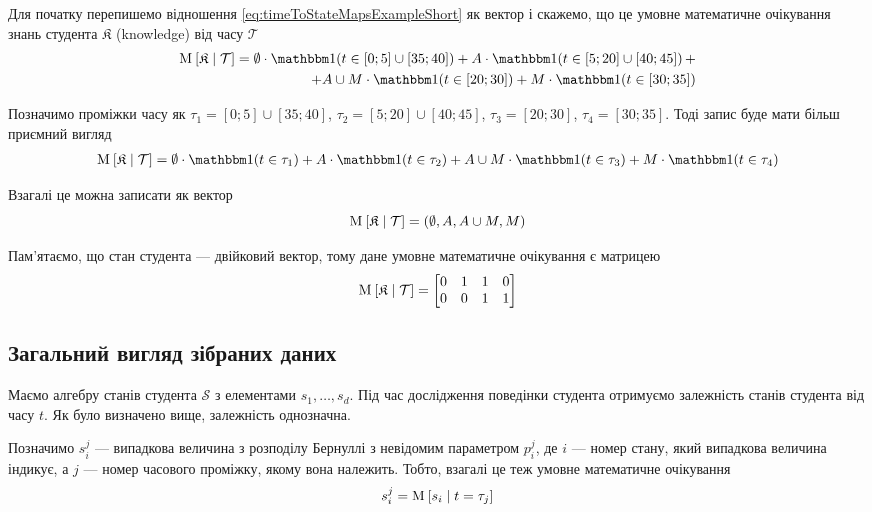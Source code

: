 Для початку перепишемо відношення \eqref{eq:timeToStateMapsExampleShort} як
вектор і скажемо, що це умовне математичне очікування знань студента
$\mathfrak{K}$ (knowledge) від часу $\mathcal{T}$
\begin{align}
  \Mean{\mathfrak{K} \mcond \mathcal{T}} =
    \emptyset \cdot
      \indicator{t \in \left[ 0; 5 \right] \cup \left[ 35; 40 \right]}
    + A \cdot
      \indicator{t \in \left[ 5; 20 \right] \cup \left[ 40; 45 \right]} + \\
    + A \cup M \cdot \indicator{t \in \left[ 20; 30 \right]}
    + M \cdot \indicator{t \in \left[ 30; 35 \right]}
\end{align}

Позначимо проміжки часу як
$\tau_1 = \left[ 0; 5 \right] \cup \left[ 35; 40 \right]$,
$\tau_2 = \left[ 5; 20 \right] \cup \left[ 40; 45 \right]$,
$\tau_3 = \left[ 20; 30 \right]$,
$\tau_4 = \left[ 30; 35 \right]$.
Тоді запис буде мати більш приємний вигляд
\begin{align*}
  \Mean{\mathfrak{K} \mcond \mathcal{T}} =
  \emptyset \cdot \indicator{t \in \tau_1} + A \cdot \indicator{t \in \tau_2}
  + A \cup M \cdot \indicator{t \in \tau_3} + M \cdot \indicator{t \in \tau_4}
\end{align*}

Взагалі це можна записати як вектор
\begin{equation*}
  \operatorname{M}_{} \left[ \mathfrak{K} \;\middle|\; \mathcal{T} \right] =
  \left( \emptyset, A, A \cup M, M \right)
\end{equation*}

Пам’ятаємо, що стан студента --- двійковий вектор, тому дане умовне математичне
очікування є матрицею
\begin{equation*}
  \operatorname{M}_{} \left[ \mathfrak{K} \;\middle|\; \mathcal{T} \right] =
  \begin{bmatrix}
    0 & 1 & 1 & 0 \\
    0 & 0 & 1 & 1
  \end{bmatrix}
\end{equation*}

\subsection{Загальний вигляд зібраних даних}

Маємо алгебру станів студента $\mathcal{S}$ з елементами $s_1, \dots, s_d$.
Під час дослідження поведінки студента отримуємо залежність станів студента
від часу $t$. Як було визначено вище, залежність однозначна.

Позначимо $s_i^j$ --- випадкова величина з розподілу Бернуллі з невідомим
параметром $p_i^j$, де $i$ --- номер стану, який випадкова величина індикує,
а $j$ --- номер часового проміжку, якому вона належить.
Тобто, взагалі це теж умовне математичне очікування
\begin{equation*}
  s_i^j = \operatorname{M}_{} \left[ s_i \;\middle|\; t=\tau_j \right]
\end{equation*}


